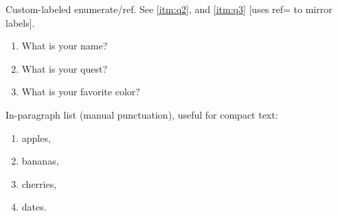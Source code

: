 \noindent Custom-labeled enumerate/ref. See \ref{itm:q2}, and \ref{itm:q3} [uses ref= to mirror labels].
\par
\begin{enumerate}[label=Q\arabic*.,ref=Q\arabic*]
  \item\label{itm:q1} What is your name?
  \item\label{itm:q2} What is your quest?
  \item\label{itm:q3} What is your favorite color?
\end{enumerate}



\noindent In-paragraph list (manual punctuation), useful for compact text:
\par
\begin{enumerate}[label=(\alph*),nosep]
  \item apples, \item bananas, \item cherries, \item dates.
\end{enumerate}